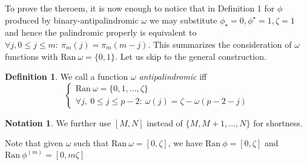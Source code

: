 \documentclass[a4paper]{article}
\theoremstyle{plain}
\theoremstyle{definition}
\newtheorem{definition}{Definition}
\newtheorem*{notation}{Notation}
\begin{document}
To prove the theroem, it is now enough to notice that in Definition 1 for $\phi$ produced by binary-antipalindromic $\omega$ we may substitute $\phi_\star = 0, \phi^\star = 1, \zeta=1$ and hence the palindromic properly is equivalent to $\forall j, 0 \le j \le m:\ \pi_m(j)=\pi_m(m-j)$.
This summarizes the consideration of $\omega$ functions with $\mathrm{Ran }\ \omega = \{0,1\} $. Let us skip to the general construction.

\begin{definition}
We call a function $\omega$  \textit{antipalindromic} iff
\[\begin{cases}
	\mathrm{Ran }\ \omega = \{0,1, \ldots, \zeta\} \\
	\forall j,\ 0 \le j \le p-2: \  \omega(j) = \zeta - \omega(p-2-j)
\end{cases}\]
\end{definition}


\begin{notation}
We further use $[M, N]$ instead of $\{M,M+1, \ldots, N\}$ for shortness.
\end{notation}
Note that given $\omega$ such that $\mathrm{Ran}\ \omega = [0,\zeta]$, we have $\mathrm{Ran}\ \phi = [0,\zeta]$ and $\mathrm{Ran}\ \phi^{(m)} = [0,m\zeta]$
\end{document}
